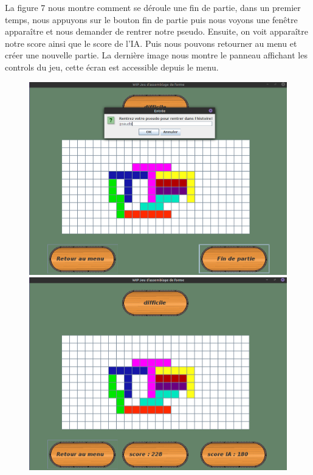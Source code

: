 \documentclass[12pt]{article}
\begin{document}
\vspace{20pt}
La figure 7 nous montre comment se déroule une fin de partie, dans un premier temps, nous appuyons sur le bouton fin de partie puis nous voyons une fenêtre apparaître et nous demander de rentrer notre pseudo. Ensuite, on voit apparaître notre score ainsi que le score de l'IA. Puis nous pouvons retourner au menu et créer une nouvelle partie. La dernière image nous montre le panneau affichant les controls du jeu, cette écran est accessible depuis le menu.

\begin{figure}[h]
\begin{center}
\includegraphics[scale=0.125]{Images/fin1.png}
\includegraphics[scale=0.125]{Images/fin2.png}

\end{center}
\end{figure}
\end{document}
